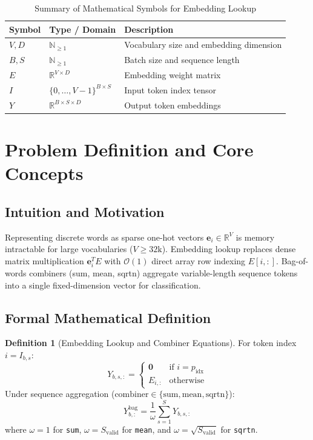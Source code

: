\documentclass[11pt,a4paper]{article}
\theoremstyle{definition}
\newtheorem{definition}{Definition}[section]
\begin{document}
\begin{table}[h]
\centering
\caption{Summary of Mathematical Symbols for Embedding Lookup}
\begin{tabular}{lll}
\toprule
\textbf{Symbol} & \textbf{Type / Domain} & \textbf{Description} \\
\midrule
$V, D$ & $\mathbb{N}_{\ge 1}$ & Vocabulary size and embedding dimension \\
$B, S$ & $\mathbb{N}_{\ge 1}$ & Batch size and sequence length \\
$E$ & $\mathbb{R}^{V \times D}$ & Embedding weight matrix \\
$I$ & $\{0, \dots, V-1\}^{B \times S}$ & Input token index tensor \\
$Y$ & $\mathbb{R}^{B \times S \times D}$ & Output token embeddings \\
\bottomrule
\end{tabular}
\end{table}

\section{Problem Definition and Core Concepts}

\subsection{Intuition and Motivation}
Representing discrete words as sparse one-hot vectors $\mathbf{e}_i \in \mathbb{R}^V$ is memory intractable for large vocabularies ($V \ge 32\text{k}$). Embedding lookup replaces dense matrix multiplication $\mathbf{e}_i^T E$ with $\mathcal{O}(1)$ direct array row indexing $E[i, :]$. Bag-of-words combiners (sum, mean, sqrtn) aggregate variable-length sequence tokens into a single fixed-dimension vector for classification.

\subsection{Formal Mathematical Definition}
\begin{definition}[Embedding Lookup and Combiner Equations]
For token index $i = I_{b, s}$:
\begin{equation}
Y_{b, s, :} = \begin{cases} \mathbf{0} & \text{if } i = p_{\text{idx}} \\ E_{i, :} & \text{otherwise} \end{cases} \label{eq:lookup_elem}
\end{equation}
Under sequence aggregation ($\text{combiner} \in \{\text{sum}, \text{mean}, \text{sqrtn}\}$):
\begin{equation}
Y_{b, :}^{\text{bag}} = \frac{1}{\omega} \sum_{s=1}^S Y_{b, s, :}
\end{equation}
where $\omega = 1$ for \texttt{sum}, $\omega = S_{\text{valid}}$ for \texttt{mean}, and $\omega = \sqrt{S_{\text{valid}}}$ for \texttt{sqrtn}.
\end{definition}
\end{document}
